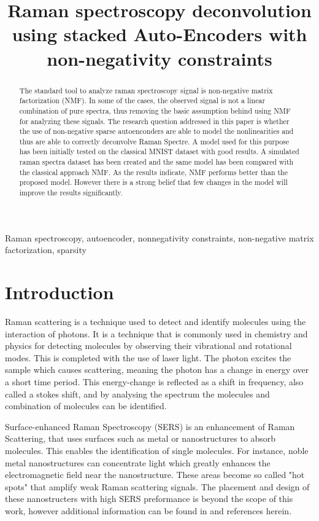 \documentclass{article}
\title{Raman spectroscopy deconvolution using stacked Auto-Encoders with non-negativity constraints}
\begin{document}
%

\maketitle
%
\begin{abstract}
The standard tool to analyze raman spectroscopy signal is non-negative matrix factorization (NMF). In some of the cases, the observed signal is not a linear combination of pure spectra, thus removing the basic assumption behind using NMF for analyzing these signals. The research question addressed in this paper is whether the use of non-negative sparse autoenconders are able to model the nonlinearities and thus are able to correctly deconvolve Raman Spectre. A model used for this purpose has been initially tested on the classical MNIST dataset with good results. A simulated raman spectra dataset has been created and the same model has been compared with the classical approach NMF. As the results indicate, NMF performs better than the proposed model. However there is a strong belief that few changes in the model will improve the results significantly.
\end{abstract}
%
\begin{keywords}
Raman spectroscopy, autoencoder, nonnegativity constraints, non-negative matrix factorization, sparsity
\end{keywords}
%
\section{Introduction}
\label{sec:intro}

Raman scattering is a technique used to detect and identify molecules using the interaction of photons. It is a technique that is commonly used in chemistry and physics for detecting molecules by observing their vibrational and rotational modes. This is completed with the use of laser light. The photon excites the sample which causes scattering, meaning the photon has a change in energy over a short time period. This energy-change is reflected as a shift in frequency, also called a stokes shift, and by analysing the spectrum the molecules and combination of molecules can be identified. 

Surface-enhanced Raman Spectroscopy (SERS) is an enhancement of Raman Scattering, that uses surfaces such as metal or nanostructures to absorb molecules. This enables the identification of single molecules.  For instance, noble metal nanostructures can concentrate light which greatly enhances the electromagnetic field near the nanostructure. These areas become so called "hot spots" that amplify weak Raman scattering signals. The placement and design of these nanostructers with high SERS preformance is beyond the scope of this work, however additional information can be found in \cite{Wei2013} and references herein.
\end{document}
